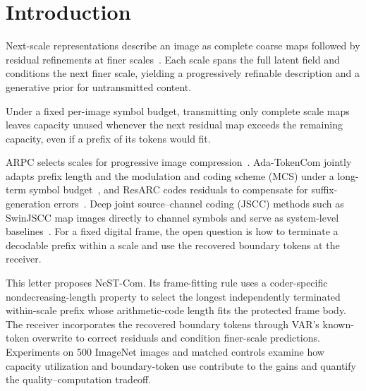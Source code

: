 \section{Introduction}
Next-scale representations describe an image as complete coarse maps followed by residual refinements at finer scales~\cite{var}. Each scale spans the full latent field and conditions the next finer scale, yielding a progressively refinable description and a generative prior for untransmitted content.

Under a fixed per-image symbol budget, transmitting only complete scale maps leaves capacity unused whenever the next residual map exceeds the remaining capacity, even if a prefix of its tokens would fit.

ARPC selects scales for progressive image compression~\cite{arpc}. Ada-TokenCom jointly adapts prefix length and the modulation and coding scheme (MCS) under a long-term symbol budget~\cite{adatokencom}, and ResARC codes residuals to compensate for suffix-generation errors~\cite{resarc}. Deep joint source--channel coding (JSCC) methods such as SwinJSCC map images directly to channel symbols and serve as system-level baselines~\cite{swinjscc}. For a fixed digital frame, the open question is how to terminate a decodable prefix within a scale and use the recovered boundary tokens at the receiver.

This letter proposes NeST-Com. Its frame-fitting rule uses a coder-specific nondecreasing-length property to select the longest independently terminated within-scale prefix whose arithmetic-code length fits the protected frame body. The receiver incorporates the recovered boundary tokens through VAR's known-token overwrite to correct residuals and condition finer-scale predictions. Experiments on 500 ImageNet images and matched controls examine how capacity utilization and boundary-token use contribute to the gains and quantify the quality--computation tradeoff.
